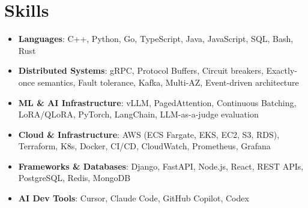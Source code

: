 \documentclass[letterpaper,11pt]{article}
\newcommand{\resumeSubHeadingListStart}{\begin{itemize}[leftmargin=0.15in, label={}]}
\newcommand{\resumeSubHeadingListEnd}{\end{itemize}}
\newcommand{\resumeSkillHeading}[2]{%
  \item\small{\textbf{#1}: #2 \vspace{-9pt}}%
}
\begin{document}
\section{Skills}
  \resumeSubHeadingListStart
    \resumeSkillHeading{Languages}{C++, Python, Go, TypeScript, Java, JavaScript, SQL, Bash, Rust}
    \resumeSkillHeading{Distributed Systems}{gRPC, Protocol Buffers, Circuit breakers, Exactly-once semantics, Fault tolerance, Kafka, Multi-AZ, Event-driven architecture}
    \resumeSkillHeading{ML \& AI Infrastructure}{vLLM, PagedAttention, Continuous Batching, LoRA/QLoRA, PyTorch, LangChain, LLM-as-a-judge evaluation}
    \resumeSkillHeading{Cloud \& Infrastructure}{AWS (ECS Fargate, EKS, EC2, S3, RDS), Terraform, K8s, Docker, CI/CD, CloudWatch, Prometheus, Grafana}
    \resumeSkillHeading{Frameworks \& Databases}{Django, FastAPI, Node.js, React, REST APIs, PostgreSQL, Redis, MongoDB}
    \resumeSkillHeading{AI Dev Tools}{Cursor, Claude Code, GitHub Copilot, Codex}
  \resumeSubHeadingListEnd
\end{document}
